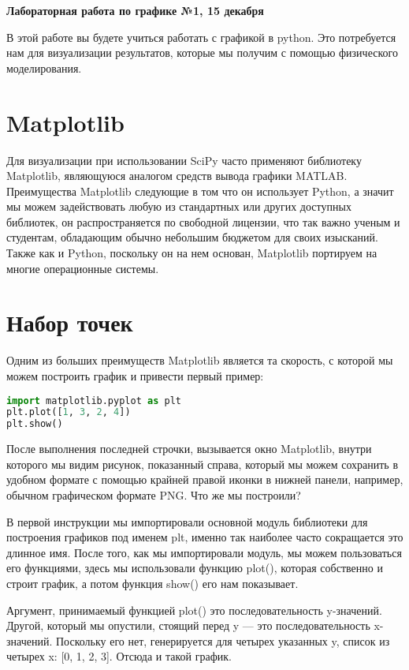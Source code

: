 \documentclass[a4paper,12pt]{article}
\begin{document}
\begin{center}
\Large{\textbf{Лабораторная работа по графике №1, 15 декабря}}
\end{center}
В этой работе вы будете учиться работать с графикой в python. Это потребуется нам для визуализации результатов, которые мы получим с помощью физического моделирования.

\section{Matplotlib}
Для визуализации при использовании SciPy часто применяют библиотеку Matplotlib, являющуюся аналогом средств вывода графики MATLAB. Преимущества Matplotlib следующие в том что он использует Python, а значит мы можем задействовать любую из стандартных или других доступных библиотек, он распространяется по свободной лицензии, что так важно ученым и студентам, обладающим обычно небольшим бюджетом для своих изысканий. Также как и Python, поскольку он на нем основан, Matplotlib портируем на многие операционные системы.
\section{Набор точек}
Одним из больших преимуществ Matplotlib является та скорость, с которой мы можем построить график и привести первый пример:
\begin{lstlisting}[language=python]
import matplotlib.pyplot as plt
plt.plot([1, 3, 2, 4])
plt.show()
\end{lstlisting}
После выполнения последней строчки, вызывается окно Matplotlib, внутри которого мы видим рисунок, показанный справа, который мы можем сохранить в удобном формате с помощью крайней правой иконки в нижней панели, например, обычном графическом формате PNG. Что же мы построили?

В первой инструкции мы импортировали основной модуль библиотеки для построения графиков под именем plt, именно так наиболее часто сокращается это длинное имя. После того, как мы импортировали модуль, мы можем пользоваться его функциями, здесь мы использовали функцию plot(), которая собственно и строит график, а потом функция show() его нам показывает.

Аргумент, принимаемый функцией plot() это последовательность y-значений. Другой, который мы опустили, стоящий перед y --- это последовательность x-значений. Поскольку его нет, генерируется для четырех указанных y, список из четырех x: [0, 1, 2, 3]. Отсюда и такой график.
\end{document}
